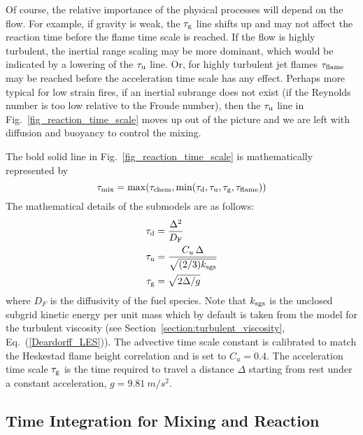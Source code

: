 Of course, the relative importance of the physical processes will depend on the flow.  For example, if gravity is weak, the $\tau_{\rm g}$ line shifts up and may not affect the reaction time before the flame time scale is reached.  If the flow is highly turbulent, the inertial range scaling may be more dominant, which would be indicated by a lowering of the $\tau_{\rm u}$ line.  Or, for highly turbulent jet flames $\tau_{\rm flame}$ may be reached before the acceleration time scale has any effect.  Perhaps more typical for low strain fires, if an inertial subrange does not exist (if the Reynolds number is too low relative to the Froude number), then the $\tau_{\rm u}$ line in Fig.~\ref{fig_reaction_time_scale} moves up out of the picture and we are left with diffusion and buoyancy to control the mixing.

The bold solid line in Fig.~\ref{fig_reaction_time_scale} is mathematically represented by
\begin{equation}
\label{eqn_tau_mix}
\tau_{\rm mix} = \max(\tau_{\rm chem},\min(\tau_{\rm d},\tau_{\rm u},\tau_{\rm g},\tau_{\rm flame}))
\end{equation}
The mathematical details of the submodels are as follows:
\begin{align}
\label{eq:tau_diff} \tau_{\rm d} &= \frac{\Delta^2}{D_{\si{F}}} \\
\label{eq:tau_sgs}  \tau_{\rm u} &= \frac{C_u \,\Delta}{\sqrt{(2/3)k_{\rm sgs}}} \\
\label{eqn_tau_grav}\tau_{\rm g} &= \sqrt{ 2\Delta/g }
\end{align}
where $D_{\si{F}}$ is the diffusivity of the fuel species. Note that $k_{\rm sgs}$ is the unclosed subgrid kinetic energy per unit mass which by default is taken from the model for the turbulent viscosity (see Section~\ref{section:turbulent_viscosity}, Eq.~(\ref{Deardorff_LES})).  The advective time scale constant is calibrated to match the Heskestad flame height correlation \cite{FDS_Validation_Guide} and is set to $C_u = 0.4$. The acceleration time scale $\tau_{\rm g}$ is the time required to travel a distance $\Delta$ starting from rest under a constant acceleration, $g=\SI{9.81}{m/s^2}$.



\subsection{Time Integration for Mixing and Reaction}
\label{sec:subgrid_evironment}

